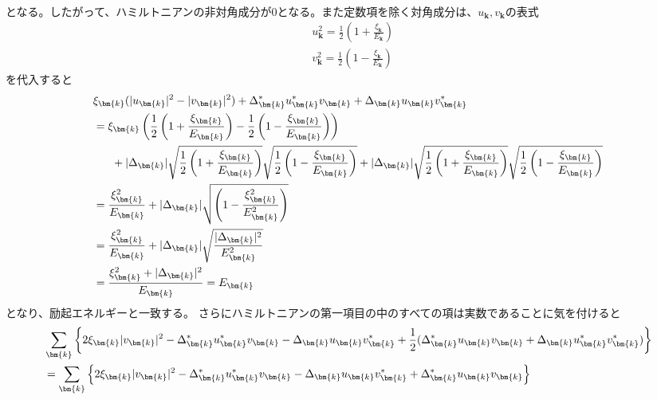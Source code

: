 \documentclass[dvipdfmx, 11pt, a4paper]{jsarticle}
\numberwithin{equation}{section}
\theoremstyle{definition}
\begin{document}
\begin{derivationBox}
\begin{align}
        \end{align}
        となる。したがって、ハミルトニアンの非対角成分が0となる。また定数項を除く対角成分は、$u_{\bm{k}},v_{\bm{k}}$の表式
        \begin{align}
            &u_{\bm{k}}^2 = \frac{1}{2} \left( 1 + \frac{\xi_{\bm{k}}}{E_{\bm{k}}} \right) \\
            &v_{\bm{k}}^2 = \frac{1}{2} \left( 1 - \frac{\xi_{\bm{k}}}{E_{\bm{k}}} \right)
        \end{align}
        を代入すると
        \begin{align}
            &\xi_{\bm{k}}(|u_{\bm{k}}|^2 - |v_{\bm{k}}|^2) +\Delta_{\bm{k}}^*  u_{\bm{k}}^* v_{\bm{k}} +\Delta_{\bm{k}}  u_{\bm{k}} v_{\bm{k}}^* \notag \\
            &=\xi_{\bm{k}}\left( \frac{1}{2} \left( 1 + \frac{\xi_{\bm{k}}}{E_{\bm{k}}} \right) - \frac{1}{2} \left( 1 - \frac{\xi_{\bm{k}}}{E_{\bm{k}}} \right) \right) \notag \\
            &\ \ \ \ \ +|\Delta_{\bm{k}}|  \sqrt{\frac{1}{2} \left( 1 + \frac{\xi_{\bm{k}}}{E_{\bm{k}}} \right)} \sqrt{\frac{1}{2} \left( 1 - \frac{\xi_{\bm{k}}}{E_{\bm{k}}} \right)} +|\Delta_{\bm{k}}|  \sqrt{\frac{1}{2} \left( 1 + \frac{\xi_{\bm{k}}}{E_{\bm{k}}} \right)} \sqrt{\frac{1}{2} \left( 1 - \frac{\xi_{\bm{k}}}{E_{\bm{k}}} \right)}  \notag \\
            &=\frac{\xi_{\bm{k}}^2}{E_{\bm{k}}} +|\Delta_{\bm{k}}|  \sqrt{\left( 1 - \frac{\xi_{\bm{k}}^2}{E_{\bm{k}}^2} \right)}   \notag \\
            &=\frac{\xi_{\bm{k}}^2}{E_{\bm{k}}} +|\Delta_{\bm{k}}|  \sqrt{\frac{|\Delta_{\bm{k}}|^2}{E_{\bm{k}}^2}}   \notag \\
            &= \frac{\xi_{\bm{k}}^2 + |\Delta_{\bm{k}}|^2}{E_{\bm{k}}} = E_{\bm{k}}
        \end{align}
        となり、励起エネルギーと一致する。
        さらにハミルトニアンの第一項目の中のすべての項は実数であることに気を付けると
        \begin{align}
            &\sum_{\bm{k}} \left\{ 2\xi_{\bm{k}} |v_{\bm{k}}|^2 - \Delta_{\bm{k}}^*  u_{\bm{k}}^* v_{\bm{k}} -\Delta_{\bm{k}}  u_{\bm{k}}v_{\bm{k}}^* + \frac{1}{2}(\Delta_{\bm{k}}^* u_{\bm{k}}v_{\bm{k}} + \Delta_{\bm{k}} u_{\bm{k}}^*v_{\bm{k}}^* ) \right\} \notag \\
            &= \sum_{\bm{k}} \left\{ 2\xi_{\bm{k}} |v_{\bm{k}}|^2 - \Delta_{\bm{k}}^*  u_{\bm{k}}^* v_{\bm{k}} -\Delta_{\bm{k}}  u_{\bm{k}}v_{\bm{k}}^* + \Delta_{\bm{k}}^* u_{\bm{k}}v_{\bm{k}} \right\} \notag \\

\end{align}
\end{derivationBox}
\end{document}
